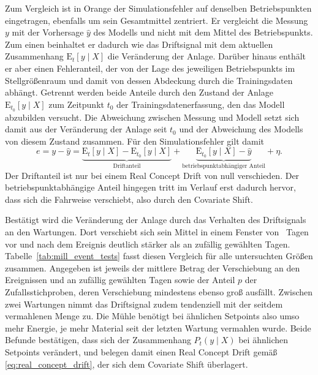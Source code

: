 %
Zum Vergleich ist in Orange der Simulationsfehler auf denselben Betriebspunkten eingetragen, ebenfalls um sein Gesamtmittel zentriert. Er vergleicht die Messung $y$ mit der Vorhersage $\hat{y}$ des Modells und nicht mit dem Mittel des Betriebspunkts. Zum einen beinhaltet er dadurch wie das Driftsignal mit dem aktuellen Zusammenhang $\mathrm{E}_t[y \mid X]$ die Veränderung der Anlage. Darüber hinaus enthält er aber einen Fehleranteil, der von der Lage des jeweiligen Betriebspunkts im Stellgrößenraum und damit von dessen Abdeckung durch die Trainingsdaten abhängt. Getrennt werden beide Anteile durch den Zustand der Anlage $\mathrm{E}_{t_0}[y \mid X]$ zum Zeitpunkt $t_0$ der Trainingsdatenerfassung, den das Modell abzubilden versucht. Die Abweichung zwischen Messung und Modell setzt sich damit aus der Veränderung der Anlage seit $t_0$ und der Abweichung des Modells von diesem Zustand zusammen. Für den Simulationsfehler gilt damit
%
\begin{equation}
    e = y - \hat{y} =
    \underbrace{\mathrm{E}_t[y \mid X] - \mathrm{E}_{t_0}[y \mid X]}_{\text{Driftanteil}}
    + \underbrace{\mathrm{E}_{t_0}[y \mid X] - \hat{y}}_{\text{betriebspunktabhängiger Anteil}}
    + \eta \text{.}
    \label{eq:mill_error_parts}
\end{equation}
%
Der Driftanteil ist nur bei einem Real Concept Drift von null verschieden. Der betriebspunktabhängige Anteil hingegen tritt im Verlauf erst dadurch hervor, dass sich die Fahrweise verschiebt, also durch den Covariate Shift. \par
%
Bestätigt wird die Veränderung der Anlage durch das Verhalten des Driftsignals an den Wartungen. Dort verschiebt sich sein Mittel in einem Fenster von \millCtxCalWinDays~Tagen vor und nach dem Ereignis deutlich stärker als an zufällig gewählten Tagen. 
Tabelle~\ref{tab:mill_event_tests} fasst diesen Vergleich für alle untersuchten Größen zusammen. Angegeben ist jeweils der mittlere Betrag der Verschiebung an den Ereignissen und an zufällig gewählten Tagen sowie der Anteil $p$ der Zufallsstichproben, deren Verschiebung mindestens ebenso groß ausfällt.
Zwischen zwei Wartungen nimmt das Driftsignal zudem tendenziell mit der seitdem vermahlenen Menge zu. Die Mühle benötigt bei ähnlichen Setpoints also umso mehr Energie, je mehr Material seit der letzten Wartung vermahlen wurde. Beide Befunde bestätigen, dass sich der Zusammenhang $P_t(y \mid X)$ bei ähnlichen Setpoints verändert, und belegen damit einen Real Concept Drift gemäß \eqref{eq:real_concept_drift}, der sich dem Covariate Shift überlagert. \par

